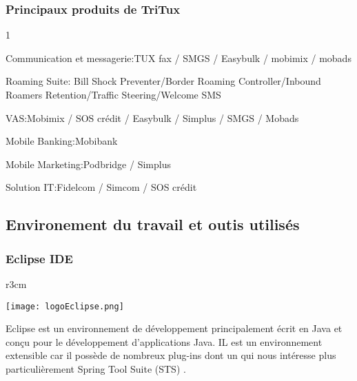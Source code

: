 \documentclass[../rapportdestage.tex]{subfiles}
\begin{document}
		\subsubsection{Principaux produits de TriTux}
		
		\begin{itemize}
		
		\end{itemize}


\clearpage








	\subsection{Environement du travail et outis utilisés}
		
		
	\subsubsection{Eclipse IDE}		

    \begin{wrapfigure}[4]{r}{3cm}

\texttt{[image: logoEclipse.png]}
 
  
\end{wrapfigure}

	
	Eclipse est un environnement de développement principalement écrit en
Java et conçu pour le développement d'applications Java.
 IL est un environnement extensible car il possède de nombreux plug-ins dont
un qui nous intéresse plus particulièrement Spring Tool Suite (STS) .
		
\end{document}
